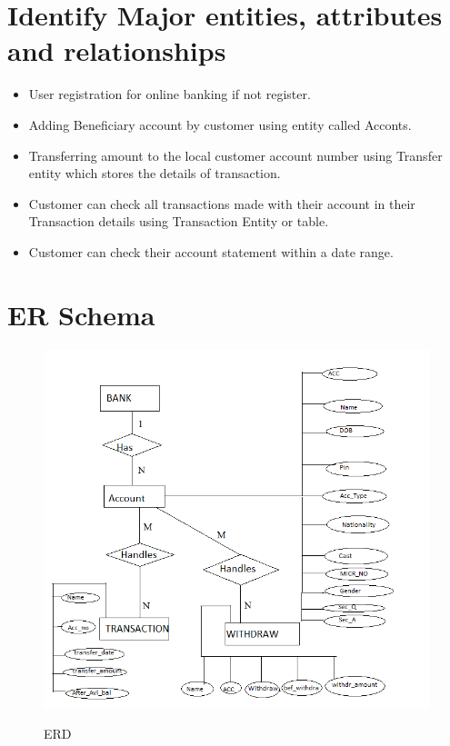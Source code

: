 \section{Identify Major entities, attributes and relationships}
\begin{itemize}
\item User registration for online banking if not register.
\item Adding Beneficiary account by customer using entity called Acconts.
\item Transferring amount to the local customer account number using Transfer entity
which stores the details of transaction.
\item Customer can check all transactions made with their account in their Transaction
details using Transaction Entity or table.
\item Customer can check their account statement within a date range.
\end{itemize}

\thispagestyle{fancy}

\section{ER Schema}
\begin{figure}[H]
\centering
\caption{ERD}
\includegraphics[scale=.5]{./erd.png}
\\[0.2in]
\label{fig:ER diagram}
\end{figure}

